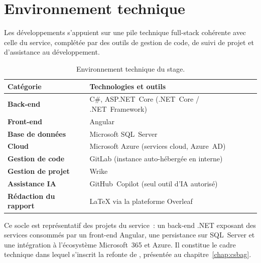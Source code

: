 \section{Environnement technique}
\label{sec:environnement-technique}
Les développements s'appuient sur une pile technique full-stack cohérente avec
celle du service, complétée par des outils de gestion de code, de suivi de
projet et d'assistance au développement.

\begin{table}[H]
  \centering
  \caption{Environnement technique du stage.}
  \label{tab:stack}
  \begin{tabularx}{\textwidth}{>{\bfseries}p{3.8cm} X}
    \toprule
    \normalfont\bfseries Catégorie & \bfseries Technologies et outils \\
    \midrule
    Back-end          & C\#, ASP.NET~Core (.NET~Core / .NET~Framework) \\
    Front-end         & Angular \\
    Base de données   & Microsoft SQL~Server \\
    Cloud             & Microsoft Azure (services cloud, Azure~AD) \\
    Gestion de code   & GitLab (instance auto-hébergée en interne) \\
    Gestion de projet & Wrike \\
    Assistance IA     & GitHub~Copilot (seul outil d'IA autorisé) \\
    Rédaction du rapport & \LaTeX{} via la plateforme Overleaf \\
    \bottomrule
  \end{tabularx}
\end{table}
Ce socle est représentatif des projets du service~: un back-end .NET exposant
des services consommés par un front-end Angular, une persistance sur SQL~Server
et une intégration à l'écosystème Microsoft~365 et Azure. Il constitue le cadre
technique dans lequel s'inscrit la refonte de \csbag, présentée au
chapitre~\ref{chap:csbag}.